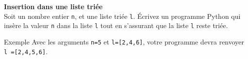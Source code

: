 \begin{Exercice}[15 minutes] [Python] \textbf{Insertion dans une liste triée}\\
    Soit un nombre entier \lstinline{n}, et une liste triée \lstinline{l}. Écrivez un programme Python qui insère la valeur \lstinline{n} dans la liste \lstinline{l} tout en s'assurant que la liste \lstinline{l} reste triée.

    

    \begin{Example}{\faTerminal \quad Exemple}
        Avec les arguments \texttt{n=5} et \texttt{l=[2,4,6]}, votre programme devra renvoyer \lstinline{l =[2,4,5,6]}.
    \end{Example}

    \begin{solution}
        
    \end{solution}


\end{Exercice}


